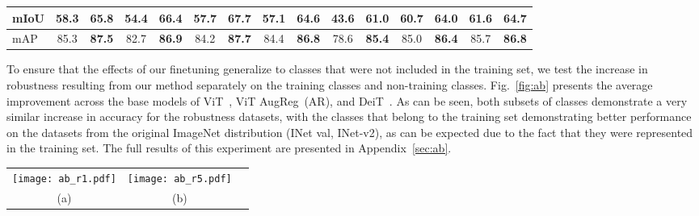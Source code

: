\documentclass{article}
\begin{document}
\begin{table}[t!]
\begin{center}
\begin{tabular}{l@{~~~}c@{~}c@{~~~}c@{~}c@{~~~}c@{~}c@{~~~}c@{~}c@{~~~}c@{~}c@{~~~}c@{~}c@{~~~}c@{~}c@{}}
         \midrule
        \small{mIoU} & 58.3 & \textbf{65.8} & 54.4 & \textbf{66.4} & 57.7 & \textbf{67.7} & 57.1 & \textbf{64.6} & 43.6 & \textbf{61.0} & 60.7 & \textbf{64.0} & 61.6 & \textbf{64.7}\\
        \midrule
        \small{mAP} & 85.3 & \textbf{87.5} & 82.7 & \textbf{86.9} & 84.2 & \textbf{87.7} & 84.4 & \textbf{86.8} & 78.6 & \textbf{85.4} & 85.0 & \textbf{86.4} & 85.7 & \textbf{86.8}
        \\
        \bottomrule
    \end{tabular}
\smallskip
    \smallskip
    \label{table:segmentation}
    \end{center}
    \vspace{-18px}
\end{table}



 To ensure that the effects of our finetuning generalize to classes that were not included in the training set, we test the increase in robustness resulting from our method separately on the training classes and non-training classes. Fig.~\ref{fig:ab} presents the average improvement across the base models of ViT~\cite{dosovitskiy2020image}, ViT AugReg~\cite{Steiner2021HowTT}(AR), and DeiT~\cite{touvron2020training}. As can be seen, both subsets of classes demonstrate a very similar increase in accuracy for the robustness datasets, with the classes that belong to the training set demonstrating better performance on the datasets from the original ImageNet distribution (INet val, INet-v2), as can be expected due to the fact that they were represented in the training set. The full results of this experiment are presented in Appendix~\ref{sec:ab}.


\begin{figure*}[t!]\centering
\begin{tabular}{c@{~~~~~~~~~~}c@{~~}c@{}}
    {{\texttt{[image: ab\_r1.pdf]}}}&
    {{\texttt{[image: ab\_r5.pdf]}}}&
    \\
    (a) & (b)\\
    \end{tabular}
\caption{Evaluation of the average change produced by our method on the training classes and on the classes that were not in the training set. Changes are averaged across the base models of ViT~\cite{dosovitskiy2020image}, ViT AugReg~\cite{Steiner2021HowTT}, and DeiT~\cite{touvron2020training}. (a) top-1 average change, (b) top-5 average change. 
    }\label{fig:ab}\vspace{-12px}
\end{figure*}
\end{document}
